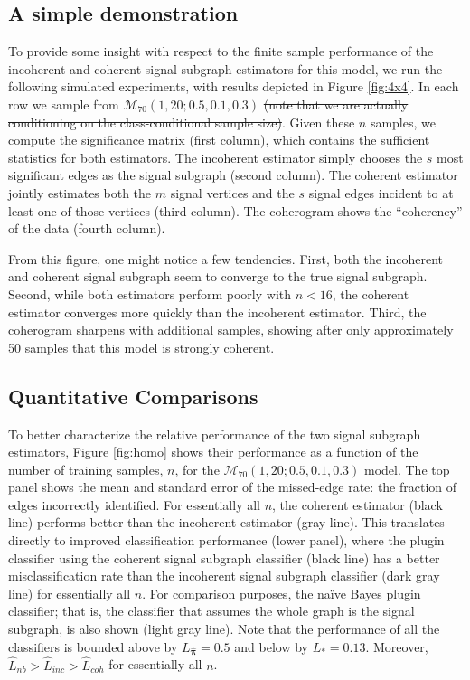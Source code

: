 \documentclass[10pt,journal,cspaper,compsoc]{IEEEtran}
\providecommand{\mc}[1]{\mathcal{#1}}
\providecommand{\wh}[1]{\widehat{#1}}
\providecommand{\mhb}[1]{\hat{\boldsymbol{#1}}}
\begin{document}
\subsection{A simple demonstration} %
\label{sub:a_simple_demonstration}
  

To provide some insight with respect to the finite sample performance of the incoherent and coherent signal subgraph estimators for this model, we run the following simulated experiments, with results depicted in  Figure \ref{fig:4x4}.  In each row we sample from $\mc{M}_{70}(1,20;0.5,0.1,0.3)$  \sout{(note that we are actually conditioning on the class-conditional sample size)}.  Given these $n$ samples, we compute the significance matrix (first column), which contains the sufficient statistics for both estimators.  The incoherent estimator simply chooses the $s$ most significant edges as the signal subgraph (second column). The coherent estimator jointly estimates both the $m$ signal vertices and the $s$ signal edges incident to at least one of those vertices (third column).  The coherogram shows the ``coherency'' of the data (fourth column).    

From this figure, one might notice a few tendencies.  First, both the incoherent and coherent signal subgraph seem to converge to the true signal subgraph.  Second, while 
both estimators perform poorly with $n < 16$, 
the coherent estimator converges more quickly than the incoherent estimator.  Third, the coherogram sharpens with additional samples,  showing after only approximately 50 samples that this model is strongly coherent.


\subsection{Quantitative Comparisons} %
\label{sub:relative_efficiencies}


To better characterize the relative performance of the two signal subgraph estimators, Figure \ref{fig:homo} shows their performance as a function of the number of training samples, $n$, for the $\mc{M}_{70}(1,20;0.5,0.1,0.3)$ model.  The top panel shows the mean and standard error of the missed-edge rate: the fraction of edges incorrectly identified.  For essentially all $n$, the coherent estimator (black line) performs better than the incoherent estimator (gray line).  This translates directly to improved classification performance (lower panel), where the plugin classifier using the coherent signal subgraph classifier (black line) has a better misclassification rate than the incoherent signal subgraph classifier (dark gray line) for essentially all $n$.  For comparison purposes, the na\"ive Bayes plugin classifier; that is, the classifier that assumes the whole graph is the signal subgraph, is also shown (light gray line).  Note that the performance of all the classifiers is bounded above by $L_{\mhb{\pi}} = 0.5$ and below by $L_* = 0.13$.  Moreover,  $\wh{L}_{nb} > \wh{L}_{inc} > \wh{L}_{coh}$ for essentially all $n$.
\end{document}
